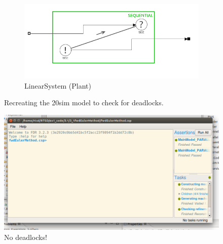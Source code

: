 \documentclass[a4paper,twoside,11pt]{article}
\begin{document}
\begin{figure}
\begin{subfigure}{0.5\textwidth}
	 \centering
	 \includegraphics[width=\textwidth]{./images/3-1_csp_linearsystem.png}
	 \caption{LinearSystem (Plant)}
	 \label{fig:3_1_csp_linearsystem}
	\end{subfigure}
	\caption{Recreating the 20sim model to check for deadlocks.}
	\label{fig:3_1_csp_model}
\end{figure}

\begin{figure}
	\centering
	\includegraphics[width=\textwidth]{./images/3-1_csp_fdr.png}
	\caption{No deadlocks!}
	\label{fig:3_1_csp_fdr}
\end{figure}
\end{document}
